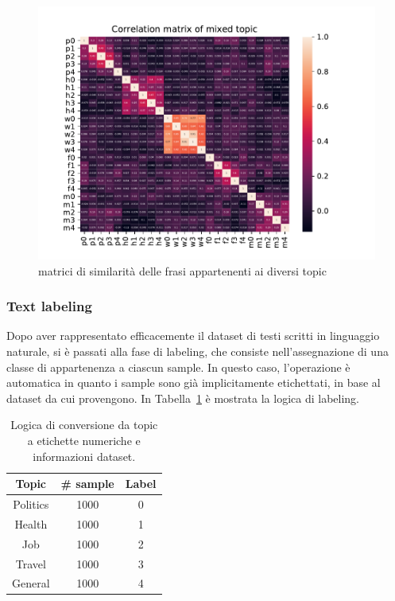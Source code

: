 \begin{figure}[h!t]
    \centering
    \includegraphics{Figure/simMatr/mixed.pdf}
    \caption{matrici di similarità delle frasi appartenenti ai diversi topic}
    \label{fig:mtrsim_mix}
\end{figure}
\FloatBarrier

\subsubsection{Text labeling}
\label{sssec:textlabeling}
Dopo aver rappresentato efficacemente il dataset di testi scritti in linguaggio naturale, si è passati alla fase di labeling, che consiste nell'assegnazione di una classe di appartenenza a ciascun sample. In questo caso, l'operazione è automatica in quanto i sample sono già implicitamente etichettati, in base al dataset da cui provengono. In Tabella~\ref{tbl:mtc} è mostrata la logica di labeling.


\begin{table}[h!t]
\centering
\begin{tabular}{c|c|c}
\toprule
\textbf{Topic} & \textbf{\# sample} & \textbf{Label} \\ \midrule
Politics & 1000 & 0 \\ 
Health & 1000& 1 \\ 
Job & 1000& 2 \\ 
Travel & 1000& 3 \\ 
General & 1000& 4 \\ \bottomrule
\end{tabular}
\caption{Logica di conversione da topic a etichette 
numeriche e informazioni dataset.}
\label{tbl:mtc}
\end{table}

